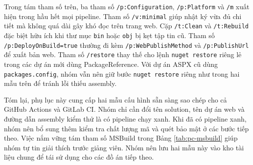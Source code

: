 Trong tám tham số trên, ba tham số \verb|/p:Configuration|, \verb|/p:Platform| và \verb|/m| xuất hiện trong hầu hết mọi pipeline.
Tham số \verb|/v:minimal| giúp nhật ký vừa đủ chi tiết mà không quá dài gây khó đọc trên trang web.
Cặp \verb|/t:Clean| và \verb|/t:Rebuild| đặc biệt hữu ích khi thư mục \verb|bin| hoặc \verb|obj| bị kẹt tập tin cũ.
Tham số \verb|/p:DeployOnBuild=true| thường đi kèm \verb|/p:WebPublishMethod| và \verb|/p:PublishUrl| để xuất bản web.
Tham số \verb|/restore| thay thế cho lệnh \verb|nuget restore| riêng lẻ trong các dự án mới dùng PackageReference.
Với dự án ASPX cũ dùng \verb|packages.config|, nhóm vẫn nên giữ bước \verb|nuget restore| riêng như trong hai mẫu trên để tránh lỗi thiếu assembly.

Tóm lại, phụ lục này cung cấp hai mẫu cấu hình sẵn sàng sao chép cho cả GitHub Actions và GitLab CI.
Nhóm chỉ cần đổi tên solution, tên dự án web và đường dẫn assembly kiểm thử là có pipeline chạy xanh.
Khi đã có pipeline xanh, nhóm nên bổ sung thêm kiểm tra chất lượng mã và quét bảo mật ở các bước tiếp theo.
Việc nắm vững tám tham số MSBuild trong Bảng \ref{tab:pc-msbuild} giúp nhóm tự tin giải thích trước giảng viên.
Nhóm nên lưu hai mẫu này vào kho tài liệu chung để tái sử dụng cho các đồ án tiếp theo.
